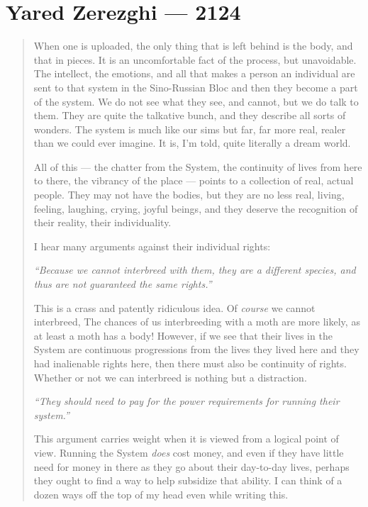 \hypertarget{yared-zerezghi-2124}{%
\chapter{Yared Zerezghi — 2124}\label{yared-zerezghi-2124}}

\begin{quote}
When one is uploaded, the only thing that is left behind is the body, and that in pieces. It is an uncomfortable fact of the process, but unavoidable. The intellect, the emotions, and all that makes a person an individual are sent to that system in the Sino-Russian Bloc and then they become a part of the system. We do not see what they see, and cannot, but we do talk to them. They are quite the talkative bunch, and they describe all sorts of wonders. The system is much like our sims but far, far more real, realer than we could ever imagine. It is, I'm told, quite literally a dream world.

All of this — the chatter from the System, the continuity of lives from here to there, the vibrancy of the place — points to a collection of real, actual people. They may not have the bodies, but they are no less real, living, feeling, laughing, crying, joyful beings, and they deserve the recognition of their reality, their individuality.

I hear many arguments against their individual rights:

\emph{``Because we cannot interbreed with them, they are a different species, and thus are not guaranteed the same rights.''}

This is a crass and patently ridiculous idea. Of \emph{course} we cannot interbreed, The chances of us interbreeding with a moth are more likely, as at least a moth has a body! However, if we see that their lives in the System are continuous progressions from the lives they lived here and they had inalienable rights here, then there must also be continuity of rights. Whether or not we can interbreed is nothing but a distraction.

\emph{``They should need to pay for the power requirements for running their system.''}

This argument carries weight when it is viewed from a logical point of view. Running the System \emph{does} cost money, and even if they have little need for money in there as they go about their day-to-day lives, perhaps they ought to find a way to help subsidize that ability. I can think of a dozen ways off the top of my head even while writing this.


\end{quote}
